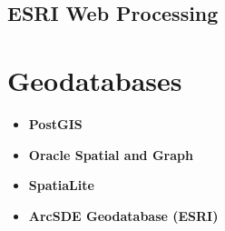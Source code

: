 \subsection{ESRI Web Processing}

\section{Geodatabases}

\begin{itemize}
\item \textbf{PostGIS}
	
\item \textbf{Oracle Spatial and Graph}
	
\item \textbf{SpatiaLite}

\item \textbf{ArcSDE Geodatabase (ESRI)}
	
\end{itemize}